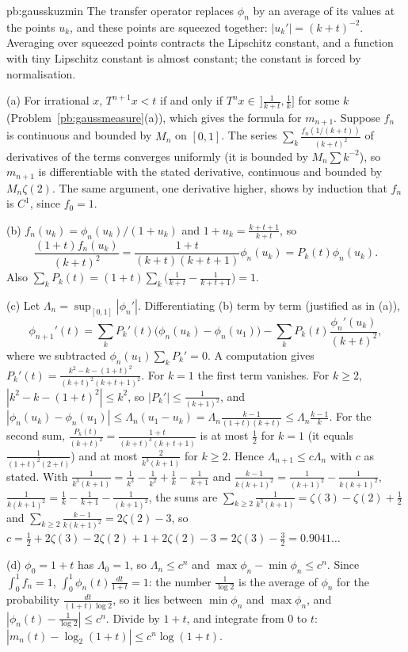 \begin{solution}{pb:gausskuzmin}
\idea The transfer operator replaces $\phi_n$ by an average of its values at the points $u_k$, and these points are squeezed
together: $|u_k'|=(k+t)^{-2}$. Averaging over squeezed points contracts the Lipschitz constant, and a function with tiny
Lipschitz constant is almost constant; the constant is forced by normalisation.

\writeup (a) For irrational $x$, $T^{n+1}x<t$ if and only if $T^nx\in\,]\frac1{k+t},\frac1k]$ for some $k$ (Problem~\ref{pb:gaussmeasure}(a)),
which gives the formula for $m_{n+1}$. Suppose $f_n$ is continuous and bounded by $M_n$ on $[0,1]$. The series
$\sum_k\frac{f_n(1/(k+t))}{(k+t)^2}$ of derivatives of the terms converges uniformly (it is bounded by $M_n\sum k^{-2}$), so $m_{n+1}$ is
differentiable with the stated derivative, continuous and bounded by $M_n\zeta(2)$. The same argument, one derivative higher,
shows by induction that $f_n$ is $C^1$, since $f_0=1$.

(b) $f_n(u_k)=\phi_n(u_k)/(1+u_k)$ and $1+u_k=\frac{k+t+1}{k+t}$, so
\[
\frac{(1+t)f_n(u_k)}{(k+t)^2}=\frac{1+t}{(k+t)(k+t+1)}\phi_n(u_k)=P_k(t)\phi_n(u_k).
\]
Also $\sum_kP_k(t)=(1+t)\sum_k\bigl(\frac1{k+t}-\frac1{k+t+1}\bigr)=1$.

(c) Let $\Lambda_n=\sup_{[0,1]}|\phi_n'|$. Differentiating (b) term by term (justified as in (a)),
\[
\phi_{n+1}'(t)=\sum_kP_k'(t)\bigl(\phi_n(u_k)-\phi_n(u_1)\bigr)-\sum_kP_k(t)\frac{\phi_n'(u_k)}{(k+t)^2},
\]
where we subtracted $\phi_n(u_1)\sum_kP_k'=0$. A computation gives
$P_k'(t)=\frac{k^2-k-(1+t)^2}{(k+t)^2(k+t+1)^2}$. For $k=1$ the first term vanishes. For $k\ge2$, $|k^2-k-(1+t)^2|\le k^2$, so
$|P_k'|\le\frac1{(k+1)^2}$, and $|\phi_n(u_k)-\phi_n(u_1)|\le\Lambda_n(u_1-u_k)=\Lambda_n\frac{k-1}{(1+t)(k+t)}\le\Lambda_n\frac{k-1}k$. For the second
sum, $\frac{P_k(t)}{(k+t)^2}=\frac{1+t}{(k+t)^3(k+t+1)}$ is at most $\frac12$ for $k=1$ (it equals $\frac1{(1+t)^2(2+t)}$) and at most
$\frac2{k^3(k+1)}$ for $k\ge2$. Hence $\Lambda_{n+1}\le c\Lambda_n$ with $c$ as stated. With $\frac1{k^3(k+1)}=\frac1{k^3}-\frac1{k^2}+\frac1k-\frac1{k+1}$
and $\frac{k-1}{k(k+1)^2}=\frac1{(k+1)^2}-\frac1{k(k+1)^2}$, $\frac1{k(k+1)^2}=\frac1k-\frac1{k+1}-\frac1{(k+1)^2}$, the sums are
$\sum_{k\ge2}\frac1{k^3(k+1)}=\zeta(3)-\zeta(2)+\frac12$ and $\sum_{k\ge2}\frac{k-1}{k(k+1)^2}=2\zeta(2)-3$, so $c=\frac12+2\zeta(3)-2\zeta(2)+1+2\zeta(2)-3=2\zeta(3)-\frac32=0.9041\ldots$

(d) $\phi_0=1+t$ has $\Lambda_0=1$, so $\Lambda_n\le c^n$ and $\max\phi_n-\min\phi_n\le c^n$. Since $\int_0^1f_n=1$,
$\int_0^1\phi_n(t)\frac{dt}{1+t}=1$: the number $\frac1{\log2}$ is the average of $\phi_n$ for the probability $\frac{dt}{(1+t)\log2}$,
so it lies between $\min\phi_n$ and $\max\phi_n$, and $|\phi_n(t)-\frac1{\log2}|\le c^n$. Divide by $1+t$, and integrate from $0$ to $t$:
$|m_n(t)-\log_2(1+t)|\le c^n\log(1+t)$.


\end{solution}
